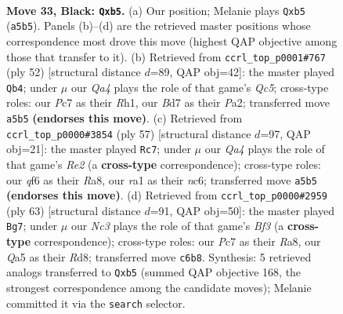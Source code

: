 \documentclass[11pt]{article}
\begin{document}
\clearpage

\begin{figure}[p]\centering
\begin{subfigure}{0.46\textwidth}\centering
\resizebox{\linewidth}{!}{%
\newchessgame
\chessboard[
  setfen={r1r3k1/pppb4/2n2Q1B/qP6/3Pp3/6P1/8/RN3RK1 b - - 2 33},
  showmover=false,
  pgfstyle=straightmove, color=movearrow, markmove={a5-b5}
]}
\caption{}
\end{subfigure}\hfill
\begin{subfigure}{0.46\textwidth}\centering
\resizebox{\linewidth}{!}{%
\newchessgame
\chessboard[
  setfen={2rqr1k1/7p/p4pp1/2Q5/2PPb3/2K2N2/P3B1PP/2R4R w - - 11 27},
  showmover=false,
  pgfstyle=straightmove, color=movearrow, markmove={c5-b4}
]}
\caption{}
\end{subfigure}
\\[4pt]
\begin{subfigure}{0.46\textwidth}\centering
\resizebox{\linewidth}{!}{%
\newchessgame
\chessboard[
  setfen={r5k1/4r1p1/2N1b1B1/p2p3p/2n5/P4P2/2Q1N2q/R3K1R1 b Q - 7 29},
  showmover=false,
  pgfstyle=straightmove, color=movearrow, markmove={e7-c7}
]}
\caption{}
\end{subfigure}\hfill
\begin{subfigure}{0.46\textwidth}\centering
\resizebox{\linewidth}{!}{%
\newchessgame
\chessboard[
  setfen={r2r3k/5p1p/5b1N/p2Rn3/4P3/2q5/P1B2QP1/5R1K b - - 0 32},
  showmover=false,
  pgfstyle=straightmove, color=movearrow, markmove={f6-g7}
]}
\caption{}
\end{subfigure}
\caption{\textbf{Move 33, Black: \texttt{Qxb5}.} (a) Our position; Melanie plays \texttt{Qxb5} (\texttt{a5b5}). Panels (b)--(d) are the retrieved master positions whose correspondence most drove this move (highest QAP objective among those that transfer to it). (b) Retrieved from \texttt{ccrl\_top\_p0001\#767} (ply 52) [structural distance $d$=89, QAP obj=42]: the master played \texttt{Qb4}; under $\mu$ our \emph{Qa4} plays the role of that game's \emph{Qc5}; cross-type roles: our \emph{P}c7 as their \emph{R}h1, our \emph{B}d7 as their \emph{P}a2; transferred move \texttt{a5b5} \textbf{(endorses this move)}. (c) Retrieved from \texttt{ccrl\_top\_p0000\#3854} (ply 57) [structural distance $d$=97, QAP obj=21]: the master played \texttt{Rc7}; under $\mu$ our \emph{Qa4} plays the role of that game's \emph{Re2} (a \textbf{cross-type} correspondence); cross-type roles: our \emph{q}f6 as their \emph{R}a8, our \emph{r}a1 as their \emph{n}c6; transferred move \texttt{a5b5} \textbf{(endorses this move)}. (d) Retrieved from \texttt{ccrl\_top\_p0000\#2959} (ply 63) [structural distance $d$=91, QAP obj=50]: the master played \texttt{Bg7}; under $\mu$ our \emph{Nc3} plays the role of that game's \emph{Bf3} (a \textbf{cross-type} correspondence); cross-type roles: our \emph{P}c7 as their \emph{R}a8, our \emph{Q}a5 as their \emph{R}d8; transferred move \texttt{c6b8}. Synthesis: 5 retrieved analogs transferred to \texttt{Qxb5} (summed QAP objective 168, the strongest correspondence among the candidate moves); Melanie committed it via the \texttt{search} selector.}
\label{fig:thought-m65}
\end{figure}
\end{document}

